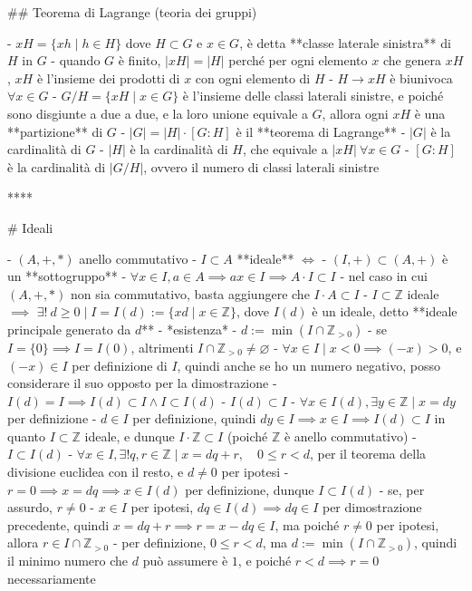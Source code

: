 ## Teorema di Lagrange (teoria dei gruppi)

- $xH = \{xh \mid h \in H\}$ dove $H \subset G$ e $x \in G$, è detta **classe laterale sinistra** di $H$ in $G$
  - quando $G$ è finito, $| xH | = | H |$ perché per ogni elemento $x$ che genera $xH$, $xH$ è l'insieme dei prodotti di $x$ con ogni elemento di $H$
    - $H \rightarrow xH$ è biunivoca $\forall x \in G$
  - $G / H = \{xH \mid x \in G\}$ è l'insieme delle classi laterali sinistre, e poiché sono disgiunte a due a due, e la loro unione equivale a $G$, allora ogni $xH$ è una **partizione** di $G$
  - $|G| = |H| \cdot [G : H]$ è il **teorema di Lagrange**
    - $|G|$ è la cardinalità di $G$
    - $|H|$ è la cardinalità di $H$, che equivale a $|xH| \ \forall x \in G$
    - $[G : H]$ è la cardinalità di $|G / H|$, ovvero il numero di classi laterali sinistre

****

# Ideali

- $(A, +, *)$ anello commutativo
- $I \subset A$ **ideale** $\iff$
  - $(I, +) \subset (A, +)$ è un **sottogruppo**
  - $\forall x \in I, a \in A \implies ax \in I \implies A \cdot I \subset I$
- nel caso in cui $(A, +, *)$ non sia commutativo, basta aggiungere che $I \cdot A \subset I$
- $I \subset \mathbb{Z}$ ideale $\implies$ \( \exists ! \ d \geq 0 \mid I=I(d):=\{x d \mid x \in \mathbb{Z}\} \), dove $I(d)$ è un ideale, detto **ideale principale generato da $d$**
  - *esistenza*
    - $d:=\min(I \cap \mathbb{Z}_{\gt 0})$
      - se $I = \{0\} \implies I = I(0)$, altrimenti \( I \cap \mathbb{Z}_{>0} \neq \varnothing \)
        - \( \forall x \in I \mid x < 0 \implies (-x)>0 \), e $(-x) \in I$ per definizione di $I$, quindi anche se ho un numero negativo, posso considerare il suo opposto per la dimostrazione
    - \( I(d)=I \implies I(d) \subset I \wedge I \subset I(d) \)
      - $I(d) \subset I$
        - $\forall x \in I(d), \exists y \in \mathbb{Z} \mid x = dy$ per definizione
        - $d \in I$ per definizione, quindi $dy \in I \implies x \in I \implies I(d) \subset I$ in quanto $I \subset \mathbb{Z}$ ideale, e dunque $I \cdot \mathbb{Z} \subset I$ (poiché $\mathbb{Z}$ è anello commutativo)
      - $I \subset I(d)$
        - \( \forall x \in I, \exists ! q,r \in \mathbb{Z} \mid x=d q+r, \quad 0 \leq r<d \), per il teorema della divisione euclidea con il resto, e $d\neq 0$ per ipotesi
          - $r = 0 \implies x = dq \implies x \in I(d)$ per definizione, dunque $I \subset I(d)$
          - se, per assurdo, $r \neq 0$
            - $x \in I$ per ipotesi, $dq \in I(d) \implies dq \in I$ per dimostrazione precedente, quindi $x = dq + r \implies r = x - dq \in I$, ma poiché $r \neq 0$ per ipotesi, allora $r \in I \cap \mathbb{Z}_{\gt 0}$
            - per definizione, $0 \le r \lt d$, ma $d:=\min(I \cap \mathbb{Z}_{\gt 0})$, quindi il minimo numero che $d$ può assumere è $1$, e poiché $r < d \implies r = 0$ necessariamente

